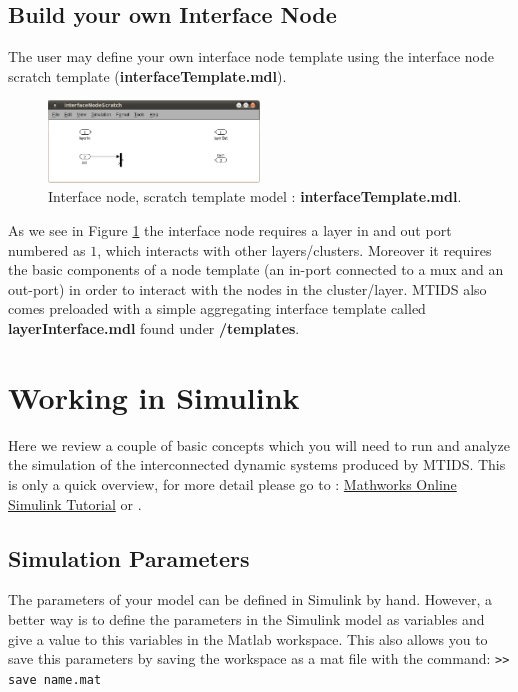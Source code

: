 \documentclass[a4paper,twoside, openright,12pt]{report}
\begin{document}
\subsection{Build your own Interface Node}

The user may define your own interface node template using the interface node scratch template (\textbf{interfaceTemplate.mdl}). \\

\begin{figure}[htb]
\centering
\includegraphics[width=0.5\textwidth]{pics/interfaceTemplate.eps}
\caption[MTIDS interface node scratch template]{Interface node, scratch template model : \textbf{interfaceTemplate.mdl}.}
\label{interfaceFig}
\end{figure}
 
As we see in Figure \ref{interfaceFig} the interface node requires a layer in and out port numbered as $1$, which interacts with other layers/clusters. 
Moreover it requires the basic components of a node template (an in-port connected to a mux and an out-port) in order to interact with the nodes in the cluster/layer.
MTIDS also comes preloaded with a simple aggregating interface template called \textbf{layerInterface.mdl} found under \textbf{/templates}.
 


 

\section{Working in Simulink}\label{workinginsimulink}

Here we review a couple of basic concepts which you will need to run and analyze the simulation of the interconnected dynamic 
systems produced by MTIDS. This is only a quick overview, for more detail please go to : \href{http://www.mathworks.com/help/toolbox/simulink/simulink_product_page.html}{Mathworks Online Simulink Tutorial} or \cite{MatlabBuch}.

\subsection{Simulation Parameters}
The parameters of your model can be defined in Simulink by hand. However, a better way is to 
define the parameters in the Simulink model as variables and give a value to this variables in the Matlab workspace. This also allows you to save this parameters
by saving the workspace as a mat file with the command: \texttt{>> save name.mat}
\end{document}
